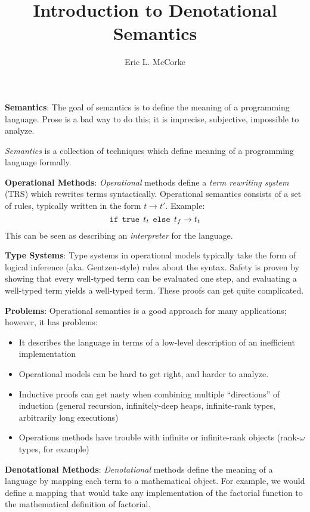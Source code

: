 \documentclass{article}
\title{Introduction to Denotational Semantics}
\author{Eric L. McCorke}
\begin{document}
\textbf{Semantics}: The goal of semantics is to define the meaning of a
programming language.  Prose is a bad way to do this; it is imprecise,
subjective, impossible to analyze.

\emph{Semantics} is a collection of techniques which define meaning of
a programming language formally.

\textbf{Operational Methods}: \emph{Operational} methods define a
\emph{term rewriting system} (TRS) which rewrites terms syntactically.
Operational semantics consists of a set of rules, typically written in
the form $t \rightarrow t'$.  Example:
\[ \operatorname{\tt if}\;\operatorname{\tt true}\;t_t\;\operatorname{\tt else}\;t_f \rightarrow t_t\]
This can be seen as describing an \emph{interpreter} for the language.

\textbf{Type Systems}: Type systems in operational models typically
take the form of logical inference (aka. Gentzen-style) rules about
the syntax.  Safety is proven by showing that every well-typed term
can be evaluated one step, and evaluating a well-typed term yields a
well-typed term.  These proofs can get quite complicated.

\textbf{Problems}: Operational semantics is a good approach for many
applications; however, it has problems:
\begin{itemize}
  \item It describes the language in terms of a low-level description
    of an inefficient implementation
  \item Operational models can be hard to get right, and harder to analyze.
  \item Inductive proofs can get nasty when combining multiple
    ``directions'' of induction (general recursion, infinitely-deep
    heaps, infinite-rank types, arbitrarily long executions)
  \item Operations methods have trouble with infinite or infinite-rank
    objects (rank-$\omega$ types, for example)
\end{itemize}

\textbf{Denotational Methods}: \emph{Denotational} methods define the
meaning of a language by mapping each term to a mathematical object.
For example, we would define a mapping that would take any
implementation of the factorial function to the mathematical
definition of factorial.
\end{document}

